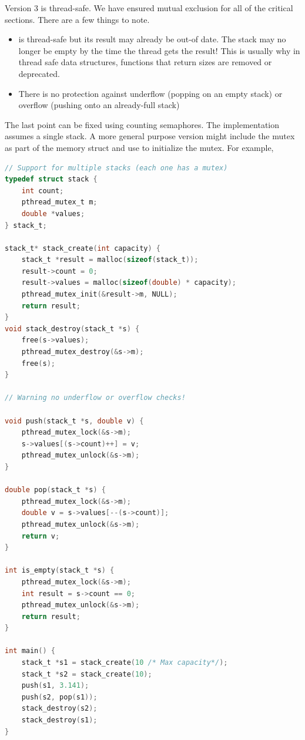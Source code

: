 Version 3 is thread-safe.
We have ensured mutual exclusion for all of the critical sections.
There are a few things to note.

\begin{itemize}
\item {} is thread-safe but its result may already be out-of date.
  The stack may no longer be empty by the time the thread gets the result!
  This is usually why in thread safe data structures, functions that return sizes are removed or deprecated.
  \item There is no protection against underflow (popping on an empty stack) or overflow (pushing onto an already-full stack)
\end{itemize}

The last point can be fixed using counting semaphores.
The implementation assumes a single stack.
A more general purpose version might include the mutex as part of the memory struct and use  to initialize the mutex.
For example,

\begin{lstlisting}[language=C]
// Support for multiple stacks (each one has a mutex)
typedef struct stack {
    int count;
    pthread_mutex_t m;
    double *values;
} stack_t;

stack_t* stack_create(int capacity) {
    stack_t *result = malloc(sizeof(stack_t));
    result->count = 0;
    result->values = malloc(sizeof(double) * capacity);
    pthread_mutex_init(&result->m, NULL);
    return result;
}
void stack_destroy(stack_t *s) {
    free(s->values);
    pthread_mutex_destroy(&s->m);
    free(s);
}

// Warning no underflow or overflow checks!

void push(stack_t *s, double v) {
    pthread_mutex_lock(&s->m);
    s->values[(s->count)++] = v;
    pthread_mutex_unlock(&s->m);
}

double pop(stack_t *s) {
    pthread_mutex_lock(&s->m);
    double v = s->values[--(s->count)];
    pthread_mutex_unlock(&s->m);
    return v;
}

int is_empty(stack_t *s) {
    pthread_mutex_lock(&s->m);
    int result = s->count == 0;
    pthread_mutex_unlock(&s->m);
    return result;
}

int main() {
    stack_t *s1 = stack_create(10 /* Max capacity*/);
    stack_t *s2 = stack_create(10);
    push(s1, 3.141);
    push(s2, pop(s1));
    stack_destroy(s2);
    stack_destroy(s1);
}
\end{lstlisting}

